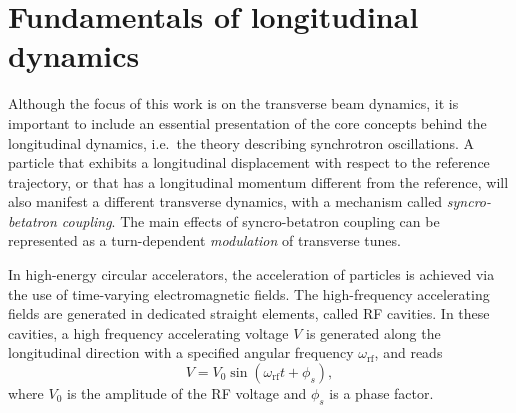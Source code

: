 
\section{Fundamentals of longitudinal dynamics}

Although the focus of this work is on the transverse beam dynamics, it is important to include an essential presentation of the core concepts behind the longitudinal dynamics, i.e.\ the theory describing synchrotron oscillations. A particle that exhibits a longitudinal displacement with respect to the reference trajectory, or that has a longitudinal momentum different from the reference, will also manifest a different transverse dynamics, with a mechanism called \textit{syncro-betatron coupling}. The main effects of syncro-betatron coupling can be represented as a turn-dependent \textit{modulation} of transverse tunes.

In high-energy circular accelerators, the acceleration of particles is achieved via the use of time-varying electromagnetic fields. The high-frequency accelerating fields are generated in dedicated straight elements, called RF cavities. In these cavities, a high frequency accelerating voltage $V$ is generated along the longitudinal direction with a specified angular frequency $\omega_{\mathrm{rf}}$, and reads
\begin{equation}
    V=V_0 \sin \left(\omega_{\mathrm{rf}} t+\phi_s\right),
\end{equation}
where $V_0$ is the amplitude of the RF voltage and $\phi_s$ is a phase factor.


